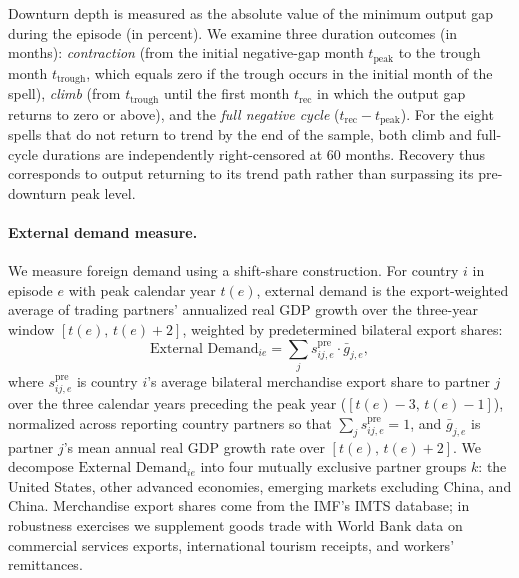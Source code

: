\documentclass[12pt, a4paper]{article}
\begin{document}
Downturn depth is measured as the absolute value of the minimum output gap during the episode (in percent). We examine three duration outcomes (in months): \emph{contraction} (from the initial negative-gap month $t_{\text{peak}}$ to the trough month $t_{\text{trough}}$, which equals zero if the trough occurs in the initial month of the spell), \emph{climb} (from $t_{\text{trough}}$ until the first month $t_{\text{rec}}$ in which the output gap returns to zero or above), and the \emph{full negative cycle} ($t_{\text{rec}} - t_{\text{peak}}$). For the eight spells that do not return to trend by the end of the sample, both climb and full-cycle durations are independently right-censored at 60 months. Recovery thus corresponds to output returning to its trend path rather than surpassing its pre-downturn peak level.

\paragraph{External demand measure.} We measure foreign demand using a shift-share construction. For country $i$ in episode $e$ with peak calendar year $t(e)$, external demand is the export-weighted average of trading partners' annualized real GDP growth over the three-year window $[t(e),\, t(e)+2]$, weighted by predetermined bilateral export shares:
\begin{equation}
\text{External Demand}_{ie} = \sum_{j} s_{ij, e}^{\text{pre}} \cdot \bar{g}_{j, e},
\label{eq:ext_demand}
\end{equation}
where $s_{ij, e}^{\text{pre}}$ is country $i$'s average bilateral merchandise export share to partner $j$ over the three calendar years preceding the peak year ($[t(e)-3,\, t(e)-1]$), normalized across reporting country partners so that $\sum_j s_{ij,e}^{\text{pre}} = 1$, and $\bar{g}_{j,e}$ is partner $j$'s mean annual real GDP growth rate over $[t(e),\, t(e)+2]$. We decompose $\text{External Demand}_{ie}$ into four mutually exclusive partner groups $k$: the United States, other advanced economies, emerging markets excluding China, and China. Merchandise export shares come from the IMF's IMTS database; in robustness exercises we supplement goods trade with World Bank data on commercial services exports, international tourism receipts, and workers' remittances.
\end{document}
